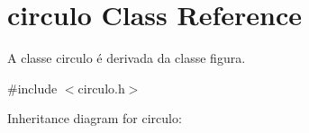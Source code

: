 \hypertarget{classcirculo}{}\section{circulo Class Reference}
\label{classcirculo}


A classe circulo é derivada da classe figura.  




{\ttfamily \#include $<$circulo.\+h$>$}



Inheritance diagram for circulo\+:
